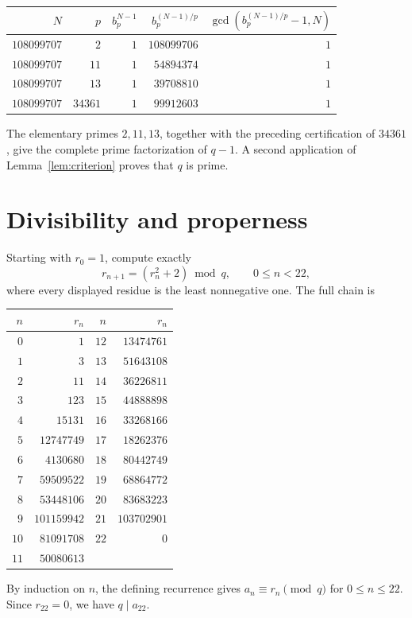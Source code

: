\documentclass[11pt]{article}
\begin{document}
\begin{center}
\begin{tabular}{rrrrr}
\toprule
$N$ & $p$ & $b_p^{N-1}$ & $b_p^{(N-1)/p}$ &
$\gcd(b_p^{(N-1)/p}-1,N)$ \\
\midrule
$108099707$ & $2$     & $1$ & $108099706$ & $1$ \\
$108099707$ & $11$    & $1$ & $54894374$  & $1$ \\
$108099707$ & $13$    & $1$ & $39708810$  & $1$ \\
$108099707$ & $34361$ & $1$ & $99912603$  & $1$ \\
\bottomrule
\end{tabular}
\end{center}
The elementary primes $2,11,13$, together with the preceding certification of
$34361$, give the complete prime factorization of $q-1$.  A second application
of Lemma~\ref{lem:criterion} proves that $q$ is prime.

\section{Divisibility and properness}

Starting with $r_0=1$, compute exactly
\[
r_{n+1}=(r_n^2+2)\bmod q,
\qquad 0\leq n<22,
\]
where every displayed residue is the least nonnegative one.  The full chain is

\begin{center}
\begin{tabular}{rr@{\qquad}rr}
\toprule
$n$ & $r_n$ & $n$ & $r_n$ \\
\midrule
$0$  & $1$         & $12$ & $13474761$  \\
$1$  & $3$         & $13$ & $51643108$  \\
$2$  & $11$        & $14$ & $36226811$  \\
$3$  & $123$       & $15$ & $44888898$  \\
$4$  & $15131$     & $16$ & $33268166$  \\
$5$  & $12747749$  & $17$ & $18262376$  \\
$6$  & $4130680$   & $18$ & $80442749$  \\
$7$  & $59509522$  & $19$ & $68864772$  \\
$8$  & $53448106$  & $20$ & $83683223$  \\
$9$  & $101159942$ & $21$ & $103702901$ \\
$10$ & $81091708$  & $22$ & $0$         \\
$11$ & $50080613$  &      &             \\
\bottomrule
\end{tabular}
\end{center}
By induction on $n$, the defining recurrence gives
$a_n\equiv r_n\pmod q$ for $0\leq n\leq22$.  Since $r_{22}=0$, we have
$q\mid a_{22}$.
\end{document}
